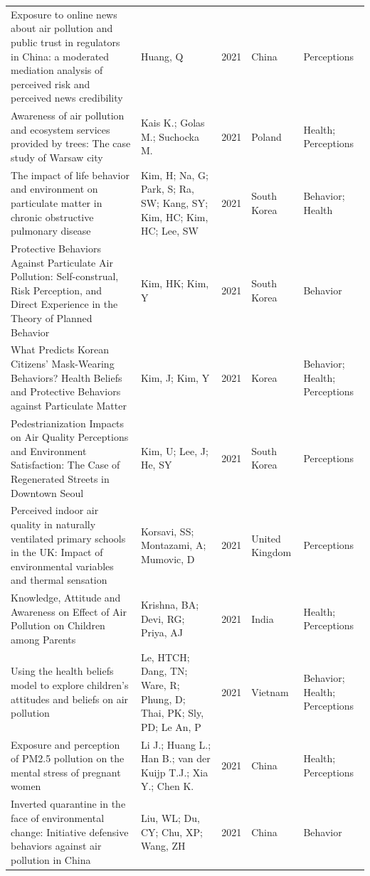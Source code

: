 {\begin{longtable}[t]{p{6cm}p{3cm}lp{3cm}p{3cm}}
Exposure to online news about air pollution and public trust in regulators in China: a moderated mediation analysis of perceived risk and perceived news credibility & Huang, Q & 2021 & China & Perceptions\\
\addlinespace
Awareness of air pollution and ecosystem services provided by trees: The case study of Warsaw city & Kais K.; Golas M.; Suchocka M. & 2021 & Poland & Health; Perceptions\\
The impact of life behavior and environment on particulate matter in chronic obstructive pulmonary disease & Kim, H; Na, G; Park, S; Ra, SW; Kang, SY; Kim, HC; Kim, HC; Lee, SW & 2021 & South Korea & Behavior; Health\\
Protective Behaviors Against Particulate Air Pollution: Self-construal, Risk Perception, and Direct Experience in the Theory of Planned Behavior & Kim, HK; Kim, Y & 2021 & South Korea & Behavior\\
What Predicts Korean Citizens' Mask-Wearing Behaviors? Health Beliefs and Protective Behaviors against Particulate Matter & Kim, J; Kim, Y & 2021 & Korea & Behavior; Health; Perceptions\\
Pedestrianization Impacts on Air Quality Perceptions and Environment Satisfaction: The Case of Regenerated Streets in Downtown Seoul & Kim, U; Lee, J; He, SY & 2021 & South Korea & Perceptions\\
\addlinespace
Perceived indoor air quality in naturally ventilated primary schools in the UK: Impact of environmental variables and thermal sensation & Korsavi, SS; Montazami, A; Mumovic, D & 2021 & United Kingdom & Perceptions\\
Knowledge, Attitude and Awareness on Effect of Air Pollution on Children among Parents & Krishna, BA; Devi, RG; Priya, AJ & 2021 & India & Health; Perceptions\\
Using the health beliefs model to explore children's attitudes and beliefs on air pollution & Le, HTCH; Dang, TN; Ware, R; Phung, D; Thai, PK; Sly, PD; Le An, P & 2021 & Vietnam & Behavior; Health; Perceptions\\
Exposure and perception of PM2.5 pollution on the mental stress of pregnant women & Li J.; Huang L.; Han B.; van der Kuijp T.J.; Xia Y.; Chen K. & 2021 & China & Health; Perceptions\\
Inverted quarantine in the face of environmental change: Initiative defensive behaviors against air pollution in China & Liu, WL; Du, CY; Chu, XP; Wang, ZH & 2021 & China & Behavior\\

\end{longtable}}
